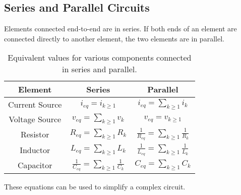 \documentclass{article}
\begin{document}
\subsection{Series and Parallel Circuits}
\begin{definition}
    Elements connected end-to-end are in series. If both ends of an element are connected directly to another element, the two elements are in parallel.
\end{definition}
\begin{table}[H]
    \centering
    \begin{tabular}{c | c c}
        \toprule
        \textbf{Element} &  \textbf{Series} & \textbf{Parallel} \\
        \midrule
        Current Source & $\displaystyle i_{eq} = i_{k\geq1}$             & $i_{eq} = \displaystyle \sum_{k\geq1} i_k$ \\
        Voltage Source & $\displaystyle v_{eq} = \sum_{k\geq1} v_k$                     & $\displaystyle v_{eq} = v_{k\geq1}$ \\
        Resistor       & $\displaystyle R_{eq} = \sum_{k\geq1} R_k$                     & $\displaystyle \frac{1}{R_{eq}} = \sum_{k\geq1} \frac{1}{R_k}$ \\
        Inductor       & $\displaystyle L_{eq} = \sum_{k\geq1} L_k$                     & $\displaystyle \frac{1}{L_{eq}} = \sum_{k\geq1} \frac{1}{L_k}$ \\
        Capacitor      & $\displaystyle \frac{1}{C_{eq}} = \sum_{k\geq1} \frac{1}{C_k}$ & $\displaystyle C_{eq} = \sum_{k\geq1} C_k$ \\
        \bottomrule
    \end{tabular}
    \caption{Equivalent values for various components connected in series and parallel.}
\end{table}
These equations can be used to simplify a complex circuit.
    
\end{document}
